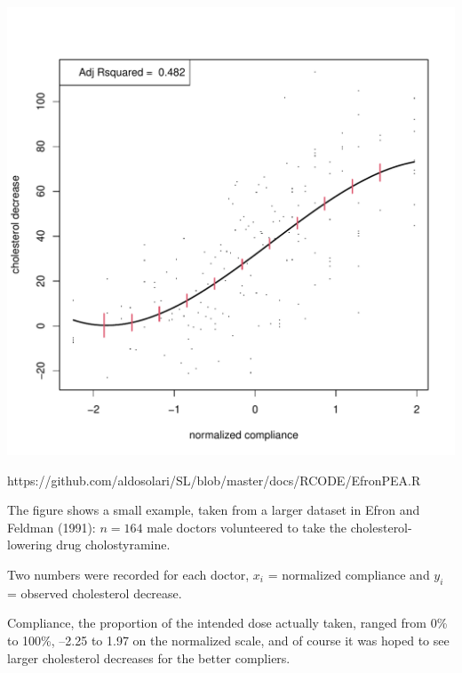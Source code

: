 \begin{frame}[fragile]

\centering
\includegraphics[scale=.45]{images/Figure_1}

https://github.com/aldosolari/SL/blob/master/docs/RCODE/EfronPEA.R

\end{frame}
\begin{frame}[fragile]

\bi
\item The figure shows a small example, taken from a larger dataset in
Efron and Feldman (1991): $n = 164$ male doctors volunteered to
take the cholesterol-lowering drug cholostyramine. 
\item Two numbers
were recorded for each doctor,
$x_i$ = normalized compliance and
$y_i$ = observed cholesterol decrease. 
\item Compliance, the proportion of the intended dose actually taken,
ranged from 0\% to 100\%, –2.25 to 1.97 on the normalized scale,
and of course it was hoped to see larger cholesterol decreases for
the better compliers.
\ei

\end{frame}
